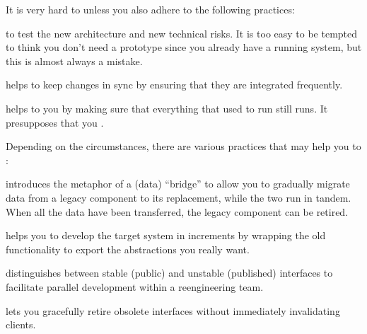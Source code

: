 \documentclass[a4paper,10pt,twoside]{book}
\begin{document}
It is very hard to  unless you also adhere to the following practices:

\begin{bulletlist}
\item {} to test the new architecture and new technical risks. It is too easy to be tempted to think you don't need a prototype since you already have a running system, but this is almost always a mistake.

\item {} helps to keep changes in sync by ensuring that they are integrated frequently.

\item {} helps to you  by making sure that everything that used to run still runs. It presupposes that you .
\end{bulletlist}

Depending on the circumstances, there are various practices that may help you to :

\begin{bulletlist}
\item {} introduces the metaphor of a (data) ``bridge'' to allow you to gradually migrate data from a legacy component to its replacement, while the two run in tandem. When all the data have been transferred, the legacy component can be retired.

\item {} helps you to develop the target system in increments by wrapping the old functionality to export the abstractions you really want.

\item {} distinguishes between stable (public) and unstable (published) interfaces to facilitate parallel development within a reengineering team.

\item {} lets you gracefully retire obsolete interfaces without immediately invalidating clients.
\end{bulletlist}
\end{document}
